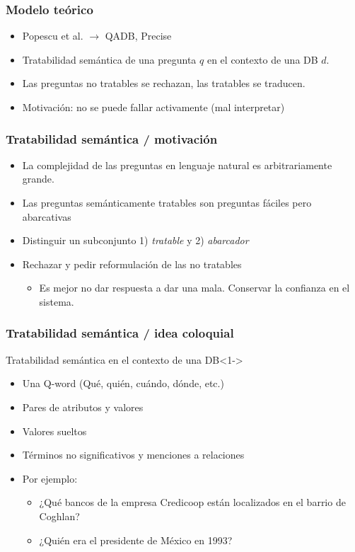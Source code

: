 \documentclass{beamer}
\begin{document}
\begin{frame}
  \frametitle{Modelo teórico}
      \begin{itemize}
          \item Popescu et al. $\rightarrow$ QADB, Precise
          \item Tratabilidad semántica de una pregunta $q$ en el contexto de una DB $d$.
          \item Las preguntas no tratables se rechazan, las tratables se traducen.
          \item Motivación: no se puede fallar activamente (mal interpretar)
      \end{itemize}
\end{frame}





\begin{frame}
  \frametitle{Tratabilidad semántica / motivación}
      \begin{itemize}
          \item La complejidad de las preguntas en lenguaje natural es arbitrariamente grande.
          \item Las preguntas semánticamente tratables son preguntas fáciles pero abarcativas
          \item Distinguir un subconjunto 1) \textit{tratable} y 2) \textit{abarcador}
          \item Rechazar y pedir reformulación de las no tratables
          \begin{itemize}
            \item Es mejor no dar respuesta a dar una mala. Conservar la confianza en el sistema.
          \end{itemize}
      \end{itemize}
\end{frame}

\begin{frame}
  \frametitle{Tratabilidad semántica / idea coloquial}
    \begin{block}{Tratabilidad semántica en el contexto de una DB}<1->
      \begin{itemize}
          \item Una Q-word (Qué, quién, cuándo, dónde, etc.)
          \item Pares de atributos y valores
          \item Valores sueltos
          \item Términos no significativos y menciones a relaciones
          \item Por ejemplo:
            \begin{itemize}
              \item ¿{\color{green}Qué} {\color{orange}bancos} de la {\color{red}empresa Credicoop} están localizados en el {\color{blue}barrio} de {\color{blue}Coghlan}?
              \item ¿{\color{green}Quién} era el {\color{red}presidente} de {\color{red}México} en {\color{orange}1993}?
            \end{itemize}
      \end{itemize}
    \end{block}
\end{frame}
\end{document}
